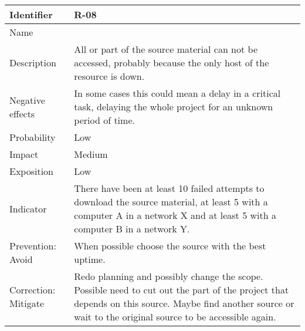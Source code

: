 \begin{table}[H]
	\begin{tabularx}{\textwidth}{|y|z|}
		\hline
		Identifier & \textbf{R-08} \\ \hline
		Name & \Rocho \\ \hline
		Description &
			All or part of the source material can not be accessed, probably because the only host of the resource is down.
		\\ \hline
		Negative effects &
			In some cases this could mean a delay in a critical task, delaying the whole project for an unknown period of time.
		\\ \hline
		Probability & Low\\ \hline
		Impact & Medium\\ \hline
		Exposition & Low\\ \hline
		Indicator & There have been at least 10 failed attempts to download the source material, at least 5 with a computer A in a network X and at least 5 with a computer B in a network Y.\\ \hline
		Prevention: Avoid &
			When possible choose the source with the best uptime.
		\\ \hline
		Correction: Mitigate &
			Redo planning and possibly change the scope. \linej
			Possible need to cut out the part of the project that depends on this source. \linej
			Maybe find another source or wait to the original source to be accessible again.
		\\ \hline
	\end{tabularx}
\end{table}

